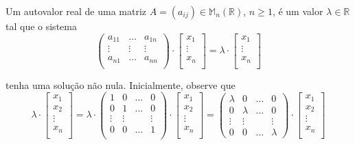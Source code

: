 Um autovalor real de uma matriz $A=(a_{ij})\in\mathbb{M}_n(\mathbb{R})$, $n\geqslant1$, é um valor $\lambda\in\mathbb{R}$ tal que o sistema
\begin{equation} \label{eq:polcar1}
\begin{pmatrix}a_{11} & \dots & a_{1n}\\ \vdots & \vdots & \vdots\\a_{n1} & \dots & a_{nn}\\ \end{pmatrix}\cdot\begin{bmatrix}x_1\\ \vdots \\ x_n\\ \end{bmatrix}=\lambda\cdot\begin{bmatrix}x_1\\ \vdots \\ x_n\\ \end{bmatrix}
\end{equation}

tenha uma solução não nula. Inicialmente, observe que
$$\lambda\cdot\begin{bmatrix}x_1\\x_2\\ \vdots\\x_n\\ \end{bmatrix}=\lambda\cdot\begin{pmatrix}1 & 0 & \dots & 0\\0 & 1 & \dots & 0\\ \vdots & \vdots & & \vdots\\0 & 0 & \dots & 1\\ \end{pmatrix}\cdot\begin{bmatrix}x_1\\x_2\\ \vdots\\x_n\\ \end{bmatrix}=\begin{pmatrix}\lambda & 0 & \dots & 0\\0 & \lambda & \dots & 0\\ \vdots & \vdots & & \vdots\\0 & 0 & \dots & \lambda \end{pmatrix}\cdot\begin{bmatrix}x_1\\x_2\\ \vdots\\x_n\\ \end{bmatrix}$$

